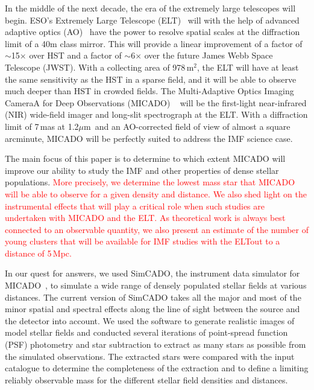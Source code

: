 \documentclass[referee]{aa}
\newcommand{\um}{$\mu$m~}
\newcommand{\s}{$\sim$}
\newcommand{\h}[1]{$^{#1}$}
\newcommand{\langedit}[1]{\textcolor{red}{#1}}
\begin{document}
In the middle of the next decade, the era of the extremely large telescopes will begin.
ESO's Extremely Large Telescope (ELT)~\citep{eelt} will with the help of advanced adaptive optics (AO)~\citep{maory} have the power to resolve spatial scales at the diffraction limit of a 40m class mirror.
This will provide a linear improvement of a factor of \s15$\times$ over HST and a factor of \s6$\times$ over the future James Webb Space Telescope (JWST).
With a collecting area of 978\,m\h2, the ELT will have at least the same sensitivity as the HST in a sparse field, and it will be able to observe much deeper than HST in crowded fields.
The Multi-Adaptive Optics Imaging CameraA for Deep Observations (MICADO) ~\citep{micado2016, micado2018} will be the first-light near-infrared (NIR) wide-field imager and long-slit spectrograph at the ELT\@.
With a diffraction limit of 7\,mas at 1.2\um and an AO-corrected field of view of almost a square arcminute, MICADO will be perfectly suited to address the IMF science case.

The main focus of this paper is to determine to which extent MICADO will improve our ability to study the IMF and other properties of dense stellar populations.
\langedit{More precisely, we determine the lowest mass star that MICADO will be able to observe for a given density and distance.
We also shed light on the instrumental effects that will play a critical role when such studies are undertaken with MICADO and the ELT.
As theoretical work is always best connected to an observable quantity, we also present an estimate of the number of young clusters that will be available for IMF studies with the ELT\@ out to a distance of 5\,Mpc.}

In our quest for answers, we used SimCADO, the instrument data simulator for MICADO~\citep{leschinski2016, leschinski19}, to simulate a wide range of densely populated stellar fields at various distances.
The current version of SimCADO takes all the major and most of the minor spatial and spectral effects along the line of sight between the source and the detector into account.
We used the software to generate realistic images of model stellar fields and  conducted several iterations of point-spread function (PSF) photometry and star subtraction to extract as many stars as possible from the simulated observations.
The extracted stars were compared with the input catalogue to determine the completeness of the extraction and to define a limiting reliably observable mass for the different stellar field densities and distances.
\end{document}
